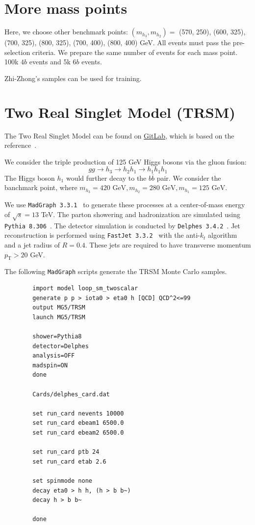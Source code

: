 \documentclass[12pt]{article}
\begin{document}
\section{More mass points}%
\label{sec:more_mass_points}
    Here, we choose other benchmark points: $(m_{h_3}, m_{h_2}) = $ (570, 250), (600, 325), (700, 325), (800, 325), (700, 400), (800, 400) GeV. All events must pass the pre-selection criteria. We prepare the same number of events for each mass point. 100k $4b$ events and 5k $6b$ events.

    Zhi-Zhong's samples can be used for training.
\section{Two Real Singlet Model (TRSM)}%
\label{sec:two_real_singlet_model_trsm_}
    The Two Real Singlet Model can be found on \href{https://gitlab.com/apapaefs/twosinglet}{GitLab}, which is based on the reference~\cite{Papaefstathiou:2020lyp}.

    We consider the triple production of 125 GeV Higgs bosons via the gluon fusion:
    \[
        g g \to h_3 \to h_2 h_1 \to h_1h_1h_1
    \]
    The Higgs boson $h_1$ would further decay to the $b \overline{b}$ pair. We consider the banchmark point, where $m_{h_3} = \text{420 GeV}, m_{h_2} = \text{280 GeV}, m_{h_1} = \text{125 GeV}$.

    We use \verb|MadGraph 3.3.1|~\cite{Alwall:2014hca} to generate these processes at a center-of-mass energy of $\sqrt{s} = 13$ TeV. The parton showering and hadronization are simulated using \verb|Pythia 8.306|~\cite{Sjostrand:2014zea}. The detector simulation is conducted by \verb|Delphes 3.4.2|~\cite{deFavereau:2013fsa}. Jet reconstruction is performed using \verb|FastJet 3.3.2|~\cite{Cacciari:2011ma} with the anti-$k_t$ algorithm~\cite{Cacciari:2008gp} and a jet radius of $R = 0.4$. These jets are required to have transverse momentum $p_{\text{T}} > 20$ GeV.

    The following \verb|MadGraph| scripts generate the TRSM Monte Carlo samples.
    \begin{lstlisting}
        import model loop_sm_twoscalar
        generate p p > iota0 > eta0 h [QCD] QCD^2<=99
        output MG5/TRSM
        launch MG5/TRSM

        shower=Pythia8
        detector=Delphes
        analysis=OFF
        madspin=ON
        done

        Cards/delphes_card.dat

        set run_card nevents 10000
        set run_card ebeam1 6500.0
        set run_card ebeam2 6500.0

        set run_card ptb 24
        set run_card etab 2.6

        set spinmode none
        decay eta0 > h h, (h > b b~) 
        decay h > b b~

        done
    \end{lstlisting}
\end{document}
